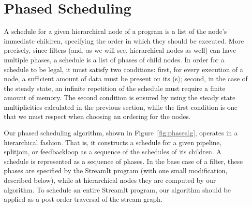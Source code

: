 \documentclass{sig-alt-full}
\begin{document}

\section{Phased Scheduling}
\label{chpt:phased}

A schedule for a given hierarchical node of a {\StreamIt} program is a
list of the node's immediate children, specifying the order in which
they should be executed.  More precisely, since filters (and, as we
will see, hierarchical nodes as well) can have multiple phases, a
schedule is a list of phases of child nodes.  In order for a schedule
to be legal, it must satisfy two conditions: first, for every
execution of a node, a sufficient amount of data must be present on
its {\Input} {\Channel}(s); second, in the case of the steady state,
an infinite repetition of the schedule must require a finite amount of
memory.  The second condition is ensured by using the steady state
multiplicities calculated in the previous section, while the first
condition is one that we must respect when choosing an ordering for
the nodes.

Our phased scheduling algorithm, shown in Figure~\ref{fig:phasealg},
operates in a hierarchical fashion.  That is, it constructs a schedule
for a given pipeline, splitjoin, or feedbackloop as a sequence of the
schedules of its children.  A schedule is represented as a sequence of
phases.  In the base case of a filter, these phases are specified by
the StreamIt program (with one small modification, described below),
while at hierarchical nodes they are computed by our algorithm.  To
schedule an entire StreamIt program, our algorithm should be applied
as a post-order traversal of the stream graph.
\end{document}
